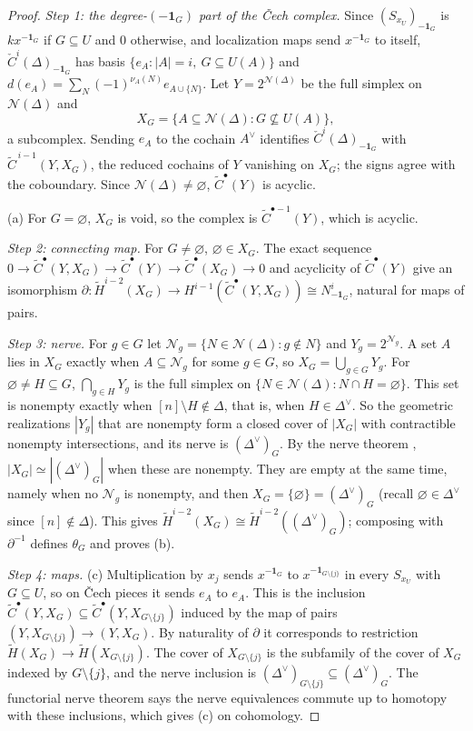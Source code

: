 \documentclass[11pt]{article}
\theoremstyle{plain}
\theoremstyle{definition}
\newcommand{\kk}{k}
\newcommand{\rH}{\widetilde{H}}
\newcommand{\rC}{\widetilde{C}}
\newcommand{\one}{\mathbf 1}
\newcommand{\Nf}{\mathcal N}
\begin{document}
\begin{proof} 
\emph{Step 1: the degree-$(-\one_G)$ part of the \v{C}ech complex.} Since $(S_{x_U})_{-\one_G}$ is $\kk x^{-\one_G}$
if $G\subseteq U$ and $0$ otherwise, and localization maps send $x^{-\one_G}$ to itself,
$\check C^i(\Delta)_{-\one_G}$ has basis $\{e_A:|A|=i,\ G\subseteq U(A)\}$ and $d(e_A)=\sum_N(-1)^{\nu_A(N)}e_{A\cup\{N\}}$.
Let $Y=2^{\Nf(\Delta)}$ be the full simplex on $\Nf(\Delta)$ and
\[
X_G=\{A\subseteq\Nf(\Delta):G\not\subseteq U(A)\},
\]
a subcomplex. Sending $e_A$ to the cochain $A^\vee$ identifies $\check C^i(\Delta)_{-\one_G}$ with
$\rC^{\,i-1}(Y,X_G)$, the reduced cochains of $Y$ vanishing on $X_G$; the signs agree with the coboundary. Since
$\Nf(\Delta)\neq\varnothing$, $\rC^\bullet(Y)$ is acyclic.

(a) For $G=\varnothing$, $X_G$ is void, so the complex is $\rC^{\bullet-1}(Y)$, which is acyclic.


\emph{Step 2: connecting map.} For $G\neq\varnothing$, $\varnothing\in X_G$. The exact sequence
$0\to\rC^\bullet(Y,X_G)\to\rC^\bullet(Y)\to\rC^\bullet(X_G)\to0$ and acyclicity of $\rC^\bullet(Y)$ give an
isomorphism $\partial\colon\rH^{i-2}(X_G)\to H^{i-1}(\rC^\bullet(Y,X_G))\cong N^i_{-\one_G}$, natural for maps of pairs.

\emph{Step 3: nerve.} For $g\in G$ let $\Nf_g=\{N\in\Nf(\Delta):g\notin N\}$ and $Y_g=2^{\Nf_g}$. A set $A$ lies in
$X_G$ exactly when $A\subseteq\Nf_g$ for some $g\in G$, so $X_G=\bigcup_{g\in G}Y_g$. For $\varnothing\neq H\subseteq G$,
$\bigcap_{g\in H}Y_g$ is the full simplex on $\{N\in\Nf(\Delta):N\cap H=\varnothing\}$. This set is nonempty exactly
when $[n]\setminus H\notin\Delta$, that is, when $H\in\Delta^\vee$. So the geometric realizations $|Y_g|$ that are
nonempty form a closed cover of $|X_G|$ with contractible nonempty intersections, and its nerve is
$(\Delta^\vee)_G$. By the nerve theorem \cite{Bjorner}, $|X_G|\simeq|(\Delta^\vee)_G|$ when these are nonempty. They
are empty at the same time, namely when no $\Nf_g$ is nonempty, and then $X_G=\{\varnothing\}=(\Delta^\vee)_G$
(recall $\varnothing\in\Delta^\vee$ since $[n]\notin\Delta$). This gives $\rH^{i-2}(X_G)\cong\rH^{i-2}((\Delta^\vee)_G)$;
composing with $\partial^{-1}$ defines $\theta_G$ and proves (b).

\emph{Step 4: maps.} (c) Multiplication by $x_j$ sends $x^{-\one_G}$ to $x^{-\one_{G\setminus\{j\}}}$ in every
$S_{x_U}$ with $G\subseteq U$, so on \v{C}ech pieces it sends $e_A$ to $e_A$. This is the inclusion
$\rC^\bullet(Y,X_G)\subseteq\rC^\bullet(Y,X_{G\setminus\{j\}})$ induced by the map of pairs
$(Y,X_{G\setminus\{j\}})\to(Y,X_G)$. By naturality of $\partial$ it corresponds to restriction
$\rH(X_G)\to\rH(X_{G\setminus\{j\}})$. The cover of $X_{G\setminus\{j\}}$ is the subfamily of the cover of $X_G$ indexed
by $G\setminus\{j\}$, and the nerve inclusion is $(\Delta^\vee)_{G\setminus\{j\}}\subseteq(\Delta^\vee)_G$. The
functorial nerve theorem \cite{BauerKerberRollRolle} says the nerve equivalences commute up to homotopy with these
inclusions, which gives (c) on cohomology.


\end{proof}
\end{document}
